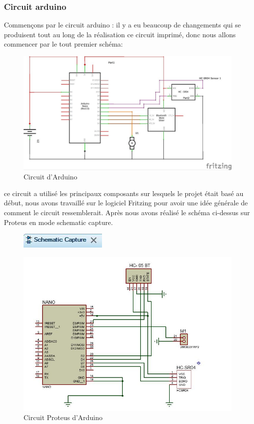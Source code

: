 \FloatBarrier

\subsubsection{Circuit arduino}
Commençons par le circuit arduino : il y a eu beaucoup de changements qui se produisent tout au long de la réalisation ce circuit imprimé, donc nous allons commencer par le tout premier schéma:

\begin{figure}[!htbp]
    \centering
    \includegraphics[width=.9\textwidth]{assets/conception1/img26.jpg}
    \caption{Circuit d'Arduino}
\end{figure}

\FloatBarrier

ce circuit a utilisé les principaux composants sur lesquels le projet était basé au début, nous avons travaillé sur le logiciel Fritzing pour avoir une idée générale de comment le circuit ressemblerait. Après nous avons réalisé le schéma ci-dessus sur Proteus en mode schematic capture.
\\[1cm]

\begin{figure}[!htbp]
    \centering
    \includegraphics[width=.4\textwidth]{assets/conception1/img34.jpg}
\end{figure}

\begin{figure}[!htbp]
    \centering
    \includegraphics[width=.9\textwidth]{assets/conception1/img30.jpg}
    \caption{Circuit Proteus d'Arduino}
\end{figure}

